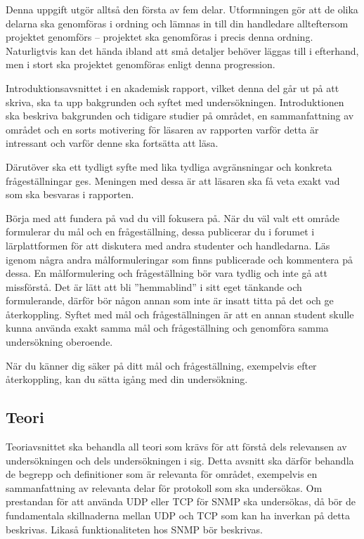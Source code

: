 \documentclass[a4paper]{miunasgn}
\begin{document}
Denna uppgift utgör alltså den första av fem delar.
Utformningen gör att de olika delarna ska genomföras i ordning och lämnas in 
till din handledare allteftersom projektet genomförs -- projektet ska 
genomföras i precis denna ordning.
Naturligtvis kan det hända ibland att små detaljer behöver läggas till 
i efterhand, men i stort ska projektet genomföras enligt denna progression.

Introduktionsavsnittet i en akademisk rapport, vilket denna del går ut på att 
skriva, ska ta upp bakgrunden och syftet med undersökningen.
Introduktionen ska beskriva bakgrunden och tidigare studier på området, en 
sammanfattning av området och en sorts motivering för läsaren av rapporten 
varför detta är intressant och varför denne ska fortsätta att läsa.

Därutöver ska ett tydligt syfte med lika tydliga avgränsningar och konkreta 
frågeställningar ges.
Meningen med dessa är att läsaren ska få veta exakt vad som ska besvaras 
i rapporten.

Börja med att fundera på vad du vill fokusera på.
När du väl valt ett område formulerar du mål och en frågeställning, dessa 
publicerar du i forumet i lärplattformen för att diskutera med andra studenter 
och handledarna.
Läs igenom några andra målformuleringar som finns publicerade och kommentera på 
dessa.
En målformulering och frågeställning bör vara tydlig och inte gå att 
missförstå.
Det är lätt att bli ''hemmablind'' i sitt eget tänkande och formulerande, 
därför bör någon annan som inte är insatt titta på det och ge återkoppling.
Syftet med mål och frågeställningen är att en annan student skulle kunna 
använda exakt samma mål och frågeställning och genomföra samma undersökning 
oberoende.

När du känner dig säker på ditt mål och frågeställning, exempelvis efter 
återkoppling, kan du sätta igång med din undersökning.

\subsection{Teori}

Teoriavsnittet ska behandla all teori som krävs för att förstå dels relevansen 
av undersökningen och dels undersökningen i sig.
Detta avsnitt ska därför behandla de begrepp och definitioner som är relevanta 
för området, exempelvis en sammanfattning av relevanta delar för protokoll som 
ska undersökas.
Om prestandan för att använda UDP eller TCP för SNMP ska undersökas, då bör de 
fundamentala skillnaderna mellan UDP och TCP som kan ha inverkan på detta 
beskrivas.
Likaså funktionaliteten hos SNMP bör beskrivas.
\end{document}
